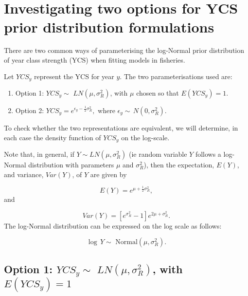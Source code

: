 \begin{appendices}\label{appendix}

\section{Investigating two options for YCS prior distribution
	formulations}\label{investigating-two-options-for-ycs-prior-distribution-formulations}

There are two common ways of parameterising the log-Normal prior
distribution of year class strength (YCS) when fitting models in
fisheries.

Let \(YCS_y\) represent the YCS for year \(y\). The two
parameterisations used are:

\begin{enumerate}
	\def\labelenumi{\arabic{enumi}.}
	\item
	Option 1: \(YCS_y \sim \,\, LN(\mu, \sigma^2_R)\), with \(\mu\) chosen
	so that \(E(YCS_y)=1\).
	\item
	Option 2:
	\(YCS_y = e^{\epsilon_y - \frac{1}{2}\sigma^2_R},\,\, \text{where } \epsilon_y \sim \,N(0, \sigma^2_R)\).
\end{enumerate}

To check whether the two representations are equivalent, we will
determine, in each case the density function of \(YCS_y\) on the
log-scale.

Note that, in general, if \(Y \sim LN(\mu, \sigma^2_R)\) (ie random
variable \(Y\) follows a log-Normal distribution with parameters \(\mu\)
and \(\sigma^2_R\)), then the expectation, \(E(Y)\), and variance,
\(Var(Y)\), of \(Y\) are given by

\[E(Y) = e^{\mu + \frac{1}{2}\sigma^2_R},\] and

\[Var(Y) = \left[e^{\sigma^2_R}-1\right]e^{2\mu + \sigma^2_R}.\] The
log-Normal distribution can be expressed on the log scale as follows:

\[\log\, Y \sim \,\, \text{Normal}(\mu, \sigma^2_R).\]

\subsection*{\texorpdfstring{Option 1:
		\(YCS_y \sim \,\, LN(\mu, \sigma^2_R)\), with
		\(E(YCS_y)=1\)}{1.1 Option 1: YCS\_y \textbackslash{}sim \textbackslash{},\textbackslash{}, LN(\textbackslash{}mu, \textbackslash{}sigma\^{}2\_R), with E(YCS\_y)=1}}\label{option-1-ycs_y-sim-lnmu-sigma2_r-with-eycs_y1}


\end{appendices}
